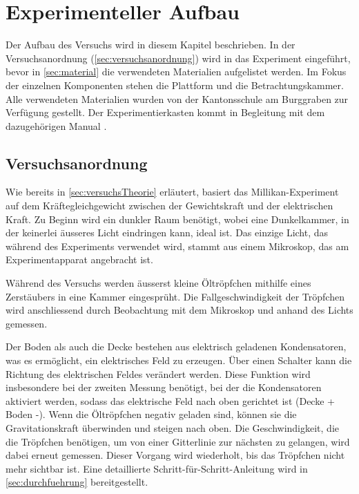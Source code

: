 \chapter{Experimenteller Aufbau}\label{cha:experimentAufbau}
Der Aufbau des Versuchs wird in diesem Kapitel beschrieben. In der Versuchsanordnung (\autoref{sec:versuchsanordnung}) wird in das Experiment eingeführt, bevor in \autoref{sec:material} die verwendeten Materialien aufgelistet werden. Im Fokus der einzelnen Komponenten stehen die Plattform und die Betrachtungskammer. Alle verwendeten Materialien wurden von der Kantonsschule am Burggraben zur Verfügung gestellt. Der Experimentierkasten kommt in Begleitung mit dem dazugehörigen Manual \parencite{instructionManualHalogen}.

\section{Versuchsanordnung}\label{sec:versuchsanordnung}

Wie bereits in \autoref{sec:versuchsTheorie} erläutert, basiert das Millikan-Experiment auf dem Kräftegleichgewicht zwischen der Gewichtskraft und der elektrischen Kraft. Zu Beginn wird ein dunkler Raum benötigt, wobei eine Dunkelkammer, in der keinerlei äusseres Licht eindringen kann, ideal ist. Das einzige Licht, das während des Experiments verwendet wird, stammt aus einem Mikroskop, das am Experimentapparat angebracht ist.

Während des Versuchs werden äusserst kleine Öltröpfchen mithilfe eines Zerstäubers in eine Kammer eingesprüht. Die Fallgeschwindigkeit der Tröpfchen wird anschliessend durch Beobachtung mit dem Mikroskop und anhand des Lichts gemessen.

Der Boden als auch die Decke bestehen aus elektrisch geladenen Kondensatoren, was es ermöglicht, ein elektrisches Feld zu erzeugen. Über einen Schalter kann die Richtung des elektrischen Feldes verändert werden. Diese Funktion wird insbesondere bei der zweiten Messung benötigt, bei der die Kondensatoren aktiviert werden, sodass das elektrische Feld nach oben gerichtet ist (Decke + Boden -). Wenn die Öltröpfchen negativ geladen sind, können sie die Gravitationskraft überwinden und steigen nach oben. Die Geschwindigkeit, die die Tröpfchen benötigen, um von einer Gitterlinie zur nächsten zu gelangen, wird dabei erneut gemessen. Dieser Vorgang wird wiederholt, bis das Tröpfchen nicht mehr sichtbar ist. Eine detaillierte Schritt-für-Schritt-Anleitung wird in \autoref{sec:durchfuehrung} bereitgestellt.

